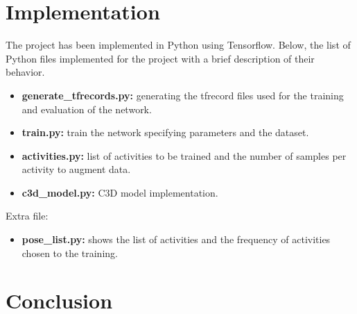 \documentclass{article}
\begin{document}

\section{Implementation}

The project has been implemented in Python using Tensorflow. Below, the list of Python files implemented for the project with a brief description of their behavior.

\begin{itemize}
    \item \textbf{generate\_tfrecords.py:} generating the tfrecord files used for the training and evaluation of the network.
    \item \textbf{train.py:} train the network specifying parameters and the dataset.
    \item \textbf{activities.py:} list of activities to be trained and the number of samples per activity to augment data.
    \item \textbf{c3d\_model.py:} C3D model implementation.
\end{itemize}

Extra file:

\begin{itemize}
    \item \textbf{pose\_list.py:} shows the list of activities and the frequency of activities chosen to the training.
\end{itemize}


\section{Conclusion}



\clearpage



\end{document}
